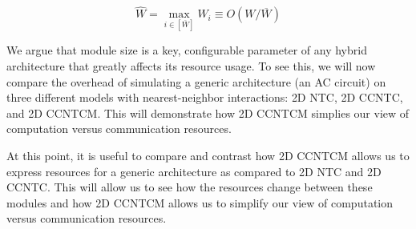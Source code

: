 \begin{equation}
\hat{W} = \max_{i \in [\overline{W}]} W_i \equiv O(W / \overline{W})
\end{equation}

We argue that module size is a key, configurable parameter of any
hybrid architecture that greatly affects its resource usage. To see this,
we will now compare the overhead of simulating a generic architecture
(an \textsf{AC} circuit) on three different models with nearest-neighbor
interactions: \textsf{2D NTC}, \textsf{2D CCNTC}, and \textsf{2D CCNTCM}.
This will demonstrate how \textsf{2D CCNTCM} simplies our view of computation
versus communication resources.





At this point, it is useful to compare and contrast how \textsf{2D CCNTCM}
allows us to express resources for a generic architecture as compared to
\textsf{2D NTC} and \textsf{2D CCNTC}. This will allow us to see how
the resources change between these modules and how \textsf{2D CCNTCM}
allows us to simplify our view of computation versus communication
resources.

